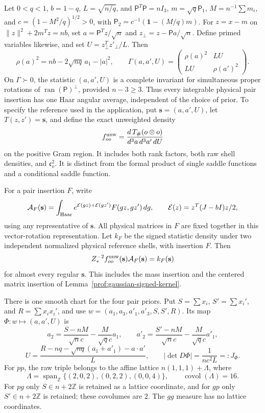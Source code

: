\begin{lemma}\label{prof:common-angular-kernel}
Let $0<q<1$, $b=1-q$, $L=\sqrt{n/q}$, and $\mathsf P^T\mathsf P=nI_3$, $m=\sqrt q\mathsf P_1$, $M=n^{-1}\sum m_i$, and
$c=(1-M^2/q)^{1/2}>0$, with
$\mathsf P_2=c^{-1}(\mathbf1-(M/q)m)$.
For $z=x-m$ on $\|z\|^2+2m^Tz=nb$, set
$a=\mathsf P^Tz/\sqrt n$ and $z_\perp=z-\mathsf P a/\sqrt n$. Define primed variables
likewise, and set $U=z_\perp^Tz'_\perp/L$. Then
\[
 \rho(a)^2=nb-2\sqrt{nq}\,a_1-|a|^2,\qquad
 \Gamma(a,a',U)=
 \begin{pmatrix}\rho(a)^2&LU\\LU&\rho(a')^2\end{pmatrix}.
\]
On $\Gamma\succ0$, the statistic $(a,a',U)$ is a complete
invariant for simultaneous proper rotations of
$\operatorname{ran}(\mathsf P)^\perp$, provided $n-3\ge3$.
Thus every integrable physical pair insertion has one Haar angular
average, independent of the choice of prior. To specify the reference
used in the application, put \(\mathbf s=(a,a',U)\), let
\(T(z,z')=\mathbf s\), and define the exact unweighted density
\[
 f_{oo}^{\rm unw}=\frac{d\,T_\#(o\otimes o)}{d^3a\,d^3a'\,dU}
\]
on the positive Gram region. It includes both rank factors, both
raw shell densities, and \(\mathfrak c_o^2\). It is distinct
from the formal product of single saddle functions and a
conditional saddle function.

For a pair insertion \(F\), write
\[
 \mathcal A_F(\mathbf s)=\int_{\rm Haar}
 e^{\mathcal E(gz)+\mathcal E(gz')}F(gz,gz')\,dg,
 \qquad \mathcal E(z)=z^T(J-bI)z/2,
\]
using any representative of \(\mathbf s\). All physical matrices
in \(F\) are fixed together in this vector-rotation representation.
Let \(k_F\) be the signed statistic density under two independent
normalized physical reference shells, with insertion \(F\).
Then
\[
 Z_*^{-2}f_{oo}^{\rm unw}(\mathbf s)\mathcal A_F(\mathbf s)
       =k_F(\mathbf s)
\]
for almost every regular \(\mathbf s\). This includes the mass
insertion and the centered matrix insertion of
Lemma~\ref{prof:gaussian-signed-kernel}.

There is one smooth chart for the four pair priors. Put
$S=\sum x_i$, $S'=\sum x_i'$, and $R=\sum x_ix_i'$, and use
$w=(a_1,a_3,a'_1,a'_3,S,S',R)$. Its map $\Phi:w\mapsto(a,a',U)$ is
\[
 a_2=\frac{S-nM}{\sqrt n c}-\frac{M}{\sqrt q c}a_1,\qquad
 a'_2=\frac{S'-nM}{\sqrt n c}-\frac{M}{\sqrt q c}a'_1,
\]
\[
 U=\frac{R-nq-\sqrt{nq}(a_1+a'_1)-a\cdot a'}{L},
 \qquad |\det D\Phi|=\frac{1}{nc^2L}=:J_\Phi.
\]
For $pp$, the raw triple belongs to the affine lattice
$n(1,1,1)+\Lambda$, where
\[
 \Lambda=\operatorname{span}_{\mathbb Z}
 \{(2,0,2),(0,2,2),(0,0,4)\},\qquad
 \operatorname{covol}(\Lambda)=16.
\]
For $pg$ only $S\in n+2\mathbb Z$ is retained as a lattice
coordinate, and for $gp$ only $S'\in n+2\mathbb Z$ is retained;
these covolumes are $2$. The $gg$ measure has no lattice coordinates.


\end{lemma}
